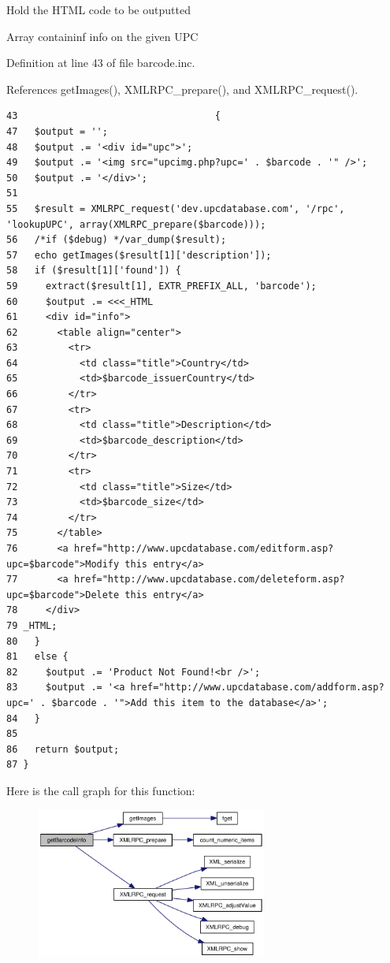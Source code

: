 Hold the HTML code to be outputted

Array containinf info on the given UPC 

Definition at line 43 of file barcode.inc.

References getImages(), XMLRPC\_\-prepare(), and XMLRPC\_\-request().

\begin{Code}\begin{verbatim}43                                   {
47   $output = '';
48   $output .= '<div id="upc">';
49   $output .= '<img src="upcimg.php?upc=' . $barcode . '" />';
50   $output .= '</div>';
51 
55   $result = XMLRPC_request('dev.upcdatabase.com', '/rpc', 'lookupUPC', array(XMLRPC_prepare($barcode)));
56   /*if ($debug) */var_dump($result);
57   echo getImages($result[1]['description']);
58   if ($result[1]['found']) {
59     extract($result[1], EXTR_PREFIX_ALL, 'barcode');
60     $output .= <<<_HTML
61     <div id="info">
62       <table align="center">
63         <tr>
64           <td class="title">Country</td>
65           <td>$barcode_issuerCountry</td>
66         </tr>
67         <tr>
68           <td class="title">Description</td>
69           <td>$barcode_description</td>
70         </tr>
71         <tr>
72           <td class="title">Size</td>
73           <td>$barcode_size</td>
74         </tr>
75       </table>
76       <a href="http://www.upcdatabase.com/editform.asp?upc=$barcode">Modify this entry</a>
77       <a href="http://www.upcdatabase.com/deleteform.asp?upc=$barcode">Delete this entry</a>
78     </div>
79 _HTML;
80   }
81   else {
82     $output .= 'Product Not Found!<br />';
83     $output .= '<a href="http://www.upcdatabase.com/addform.asp?upc=' . $barcode . '">Add this item to the database</a>';
84   }
85 
86   return $output;
87 }\end{verbatim}
\end{Code}




Here is the call graph for this function:\nopagebreak
\begin{figure}[H]
\begin{center}
\leavevmode
\includegraphics[width=215pt]{barcode_8inc_e10c37e4f9f9b7c6617a388351a27c99_cgraph}
\end{center}
\end{figure}

